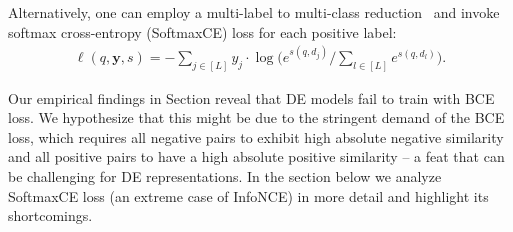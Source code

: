 \documentclass{article}
\begin{document}
Alternatively, one can employ a multi-label to multi-class reduction~\citep{menon2019reduction} %
and invoke softmax cross-entropy (SoftmaxCE) loss for each positive label: 
\begin{align}
\label{eq:sce-pal}
\ell(q, \mathbf{y}, s) =  - \sum\nolimits_{j \in [L]}y_{j}\cdot{\log \Big({e^{s(q, d_j)}}/{\sum\nolimits_{l \in [L]} e^{s(q, d_{l})}}\Big)}.
\end{align}

Our empirical findings in Section reveal that DE models fail to train with BCE loss. We hypothesize that this might be due to the stringent demand of the BCE loss, which requires all negative pairs to exhibit high absolute negative similarity and all positive pairs to have a high absolute positive similarity – a feat that can be challenging for DE representations. In the section below we analyze SoftmaxCE loss (an extreme case of InfoNCE) in more detail and highlight its shortcomings.

\printbibliography
\end{document}
